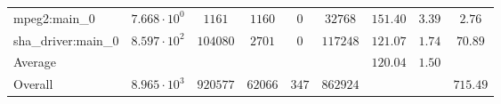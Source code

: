 \begin{tabular}{|l|c|c|c|c|c|c|c|c|}
mpeg2:main\_0           & $ 7.668 \cdot 10^{0} $ & $ 1161   $ & $ 1160  $ & $ 0   $ & $ 32768  $ & $ 151.40      $ & $ 3.39    $ & $ 2.76    $ \\
sha\_driver:main\_0     & $ 8.597 \cdot 10^{2} $ & $ 104080 $ & $ 2701  $ & $ 0   $ & $ 117248 $ & $ 121.07      $ & $ 1.74    $ & $ 70.89   $ \\
\hline
Average                 & $                    $ & $        $ & $       $ & $     $ & $        $ & $ 120.04      $ & $ 1.50    $ & $         $ \\
\hline
Overall                 & $ 8.965 \cdot 10^{3} $ & $ 920577 $ & $ 62066 $ & $ 347 $ & $ 862924 $ & $             $ & $         $ & $ 715.49  $ \\
\hline
\end{tabular}
